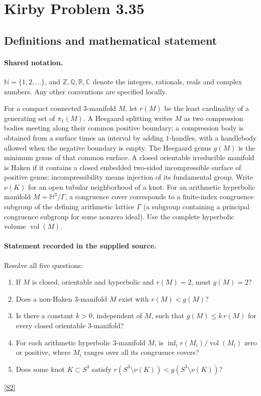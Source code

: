 \documentclass[11pt]{article}
\newcommand{\sref}[2]{\hyperlink{source:#1:#2}{[S#2]}}
\begin{document}
\section{Kirby Problem 3.35}\label{statement}

\subsection{Definitions and mathematical statement}

\paragraph{Shared notation.}$\mathbb N=\{1,2,\ldots\}$, and $\mathbb Z,\mathbb Q,\mathbb R,\mathbb C$ denote the integers, rationals, reals and complex numbers. Any other conventions are specified locally.


For a compact connected $3$-manifold $M$, let $r(M)$ be the least cardinality of a generating set of $\pi_1(M)$. A Heegaard splitting writes $M$ as two compression bodies meeting along their common positive boundary; a compression body is obtained from a surface times an interval by adding $1$-handles, with a handlebody allowed when the negative boundary is empty. The Heegaard genus $g(M)$ is the minimum genus of that common surface. A closed orientable irreducible manifold is Haken if it contains a closed embedded two-sided incompressible surface of positive genus; incompressibility means injection of its fundamental group. Write $\nu(K)$ for an open tubular neighborhood of a knot.
For an arithmetic hyperbolic manifold $M=\mathbb H^3/\Gamma$, a congruence cover corresponds to a finite-index congruence subgroup of the defining arithmetic lattice $\Gamma$ (a subgroup containing a principal congruence subgroup for some nonzero ideal). Use the complete hyperbolic volume $\operatorname{vol}(M)$.
\paragraph{Statement recorded in the supplied source.}
Resolve all five questions:
\begin{enumerate}
\item If $M$ is closed, orientable and hyperbolic and $r(M)=2$, must $g(M)=2$?
\item Does a non-Haken $3$-manifold $M$ exist with $r(M)<g(M)$?
\item Is there a constant $k>0$, independent of $M$, such that $g(M)\le k\,r(M)$ for every closed orientable $3$-manifold?
\item For each arithmetic hyperbolic $3$-manifold $M$, is $\inf_i r(M_i)/\operatorname{vol}(M_i)$ zero or positive, where $M_i$ ranges over all its congruence covers?
\item Does some knot $K\subset S^3$ satisfy $r(S^3\setminus\nu(K))<g(S^3\setminus\nu(K))$?
\end{enumerate}
\sref{statement}{2}
\end{document}
